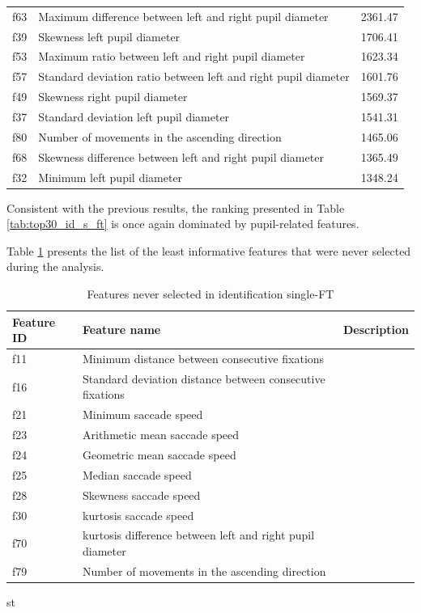 \documentclass{article}
\begin{document}
\begin{table}[htbp]
\begin{tabular}{lll}
f63 & Maximum difference between left and right pupil diameter & 2361.47 \\
f39 & Skewness left pupil diameter & 1706.41 \\
f53 & Maximum ratio between left and right pupil diameter & 1623.34 \\
f57 & Standard deviation ratio between left and right pupil diameter & 1601.76 \\
f49 & Skewness right pupil diameter & 1569.37 \\
f37 & Standard deviation left pupil diameter & 1541.31 \\
f80 & Number of movements in the ascending direction & 1465.06 \\
f68 & Skewness difference between left and right pupil diameter & 1365.49 \\
f32 & Minimum left pupil diameter & 1348.24 \\
\bottomrule
\end{tabular}
\end{table}

Consistent with the previous results, the ranking presented in Table \ref{tab:top30_id_s_ft} is once again dominated by pupil-related features.

Table \ref{tab:never_selected_features_ft} presents the list of the least informative features that were never selected during the analysis.


\begin{table}[H]
\centering
\small
\setlength{\tabcolsep}{4pt} %
\caption{Features never selected in identification single-FT}
\label{tab:never_selected_features_ft}
\begin{tabular}{lll}
\toprule
\textbf{Feature ID} & \textbf{Feature name} & \textbf{Description} \\
\midrule
f11 & Minimum distance between consecutive fixations \\
f16 & Standard deviation distance between consecutive fixations \\
f21 & Minimum saccade speed \\
f23 & Arithmetic mean saccade speed \\
f24 & Geometric mean saccade speed \\
f25 & Median saccade speed \\
f28 & Skewness saccade speed \\
f30 & kurtosis saccade speed \\
f70 & kurtosis difference between left and right pupil diameter \\
f79 & Number of movements in the ascending direction \\
\bottomrule
\end{tabular}st
\end{table}
\FloatBarrier
\end{document}
